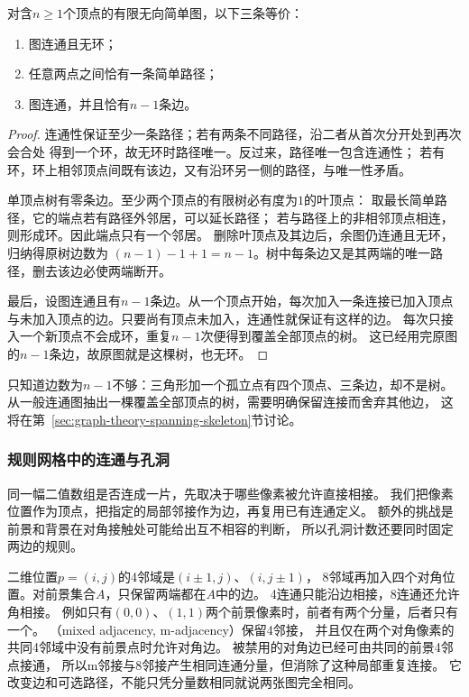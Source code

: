 \begin{theorem}[树的等价刻画]
  \label{thm:graph-theory-tree-characterizations}
  对含\(n\geq1\)个顶点的有限无向简单图，以下三条等价：
  \begin{enumerate}
    \item 图连通且无环；
    \item 任意两点之间恰有一条简单路径；
    \item 图连通，并且恰有\(n-1\)条边。
  \end{enumerate}
\end{theorem}

\begin{proof}
连通性保证至少一条路径；若有两条不同路径，沿二者从首次分开处到再次会合处
得到一个环，故无环时路径唯一。反过来，路径唯一包含连通性；
若有环，环上相邻顶点间既有该边，又有沿环另一侧的路径，与唯一性矛盾。

单顶点树有零条边。至少两个顶点的有限树必有度为\(1\)的叶顶点：
取最长简单路径，它的端点若有路径外邻居，可以延长路径；
若与路径上的非相邻顶点相连，则形成环。因此端点只有一个邻居。
删除叶顶点及其边后，余图仍连通且无环，归纳得原树边数为
\((n-1)-1+1=n-1\)。树中每条边又是其两端的唯一路径，删去该边必使两端断开。

最后，设图连通且有\(n-1\)条边。从一个顶点开始，每次加入一条连接已加入顶点
与未加入顶点的边。只要尚有顶点未加入，连通性就保证有这样的边。
每次只接入一个新顶点不会成环，重复\(n-1\)次便得到覆盖全部顶点的树。
这已经用完原图的\(n-1\)条边，故原图就是这棵树，也无环。
\end{proof}

只知道边数为\(n-1\)不够：三角形加一个孤立点有四个顶点、三条边，却不是树。
从一般连通图抽出一棵覆盖全部顶点的树，需要明确保留连接而舍弃其他边，
这将在第~\ref{sec:graph-theory-spanning-skeleton}节讨论。

\subsubsection{规则网格中的连通与孔洞}
\label{sec:graph-digital-connectivity}

同一幅二值数组是否连成一片，先取决于哪些像素被允许直接相接。
我们把像素位置作为顶点，把指定的局部邻接作为边，再复用已有连通定义。
额外的挑战是前景和背景在对角接触处可能给出互不相容的判断，
所以孔洞计数还要同时固定两边的规则。

二维位置$p=(i,j)$的4邻域是$(i\pm1,j)$、$(i,j\pm1)$，
8邻域再加入四个对角位置。对前景集合$A$，只保留两端都在$A$中的边。
4连通只能沿边相接，8连通还允许角相接。
例如只有$(0,0)$、$(1,1)$两个前景像素时，前者有两个分量，后者只有一个。
（mixed adjacency, m-adjacency）保留4邻接，
并且仅在两个对角像素的共同4邻域中没有前景点时允许对角边。
被禁用的对角边已经可由共同的前景4邻点接通，
所以m邻接与8邻接产生相同连通分量，但消除了这种局部重复连接。
它改变边和可选路径，不能只凭分量数相同就说两张图完全相同。

